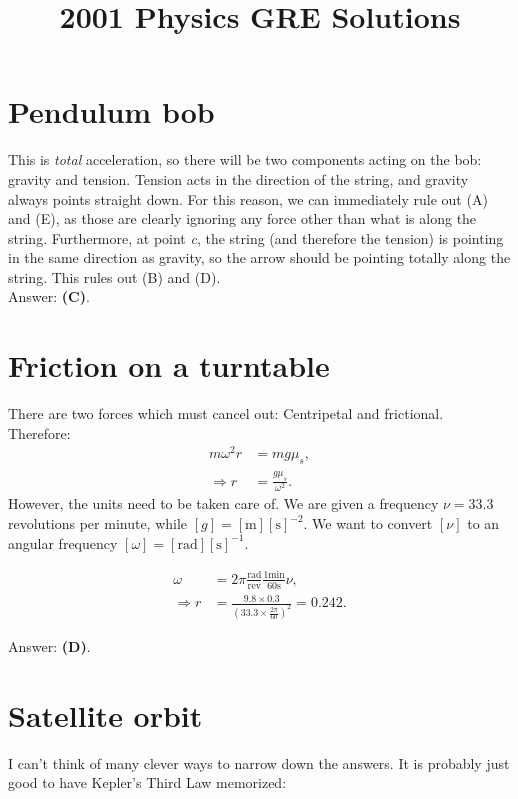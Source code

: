 \documentclass[11pt]{paper}
\title{2001 Physics GRE Solutions\blfootnote{Alex Deich, July 2016}}
\author{}
\newcommand{\answer}[1]{Answer: \textbf{(#1)}.}
\begin{document}
\maketitle

\section{Pendulum bob}
This is \emph{total} acceleration, so there will be two components acting on the bob: gravity and tension.  Tension acts in the direction of the string, and gravity always points straight down.  For this reason, we can immediately rule out (A) and (E), as those are clearly ignoring any force other than what is along the string.  Furthermore, at point \emph{c}, the string (and therefore the tension) is pointing in the same direction as gravity, so the arrow should be pointing totally along the string.  This rules out (B) and (D).\\

\answer{C}

\section{Friction on a turntable}
There are two forces which must cancel out:  Centripetal and frictional.\\
Therefore:
\begin{align}
m \omega^2 r &= m g \mu_s,\\
\Rightarrow r &= \frac{g \mu_s}{\omega^2}.
\end{align}
However, the units need to be taken care of.  We are given a frequency $\nu = 33.3$ revolutions per minute, while $[g] = [\text{m}][\text{s}]^{-2}$.  We want to convert $[\nu]$ to an angular frequency $[\omega] = [\text{rad}][\text{s}]^{-1}$.

\begin{align}
\omega &= 2 \pi \frac{\text{rad}}{\text{rev}} \frac{1 \text{min}}{60 \text{s}} \nu,\\
\Rightarrow r &= \frac{9.8 \times 0.3}{\left(33.3 \times \frac{2 \pi}{60} \right)^2} = 0.242.
\end{align}

\answer{D}

\section{Satellite orbit}
I can't think of many clever ways to narrow down the answers.  It is probably just good to have Kepler's Third Law memorized:
\end{document}
